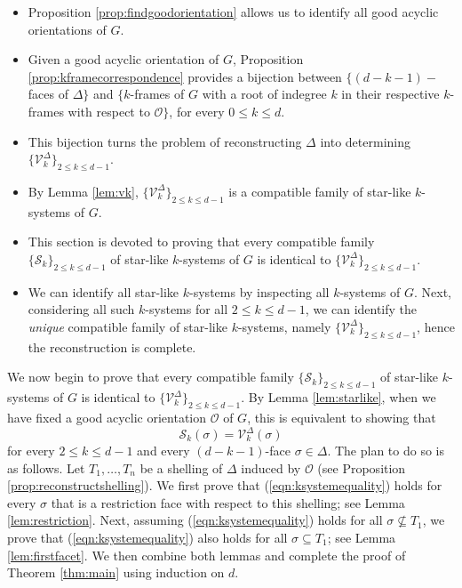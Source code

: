 \documentclass[11pt,twoside]{article}
\theoremstyle{definition}
\newcommand{\cS}{\mathcal{S}}
\newcommand{\cO}{\mathcal{O}}
\newcommand{\cV}{\mathcal{V}}
\begin{document}
\begin{itemize} [label={--}] 

\item Proposition \ref{prop:findgoodorientation} allows us to identify all good acyclic orientations of $G$.

\item Given a good acyclic orientation of $G$, Proposition \ref{prop:kframecorrespondence} provides a bijection between $\{(d-k-1)-$faces of $\Delta\}$ and $\{k$-frames of $G$ with a root of indegree $k$ in their respective $k$-frames with respect to $\cO\}$, for every $0 \le k \le d$. 

\item This bijection turns the problem of reconstructing $\Delta$ into determining $\{\cV^\Delta_k\}_{2 \le k \le d-1}$. 


\item By Lemma \ref{lem:vk},  $\{\cV^\Delta_k\}_{2 \le k \le d-1}$ is a compatible family of star-like $k$-systems of $G$. 

\item This section is devoted to proving that every compatible family $\{\cS_k\}_{2 \le k \le d-1}$ of star-like $k$-systems of $G$ is identical to $\{\cV^\Delta_k\}_{2 \le k \le d-1}$. 

\item We can identify all star-like $k$-systems by inspecting all $k$-systems of $G$. Next, considering all such $k$-systems for all $2 \le k \le d-1$, we can identify the \emph{unique} compatible family of star-like $k$-systems, namely $\{\cV^\Delta_k\}_{2 \le k \le d-1}$, hence the reconstruction is complete.
\end{itemize}

We now begin to prove that every compatible family $\{\cS_k\}_{2 \le k \le d-1}$ of star-like $k$-systems of $G$ is identical to $\{\cV^\Delta_k\}_{2 \le k \le d-1}$. By Lemma \ref{lem:starlike}, when we have fixed a good acyclic orientation $\cO$ of $G$, this is equivalent to showing that 
\begin{equation}\label{eqn:ksystemequality}
    \cS_k(\sigma) = \cV^\Delta_k(\sigma)
\end{equation}
for every $2 \le k \le d-1$ and every $(d-k-1)$-face $\sigma \in \Delta$. The plan to do so is as follows. Let $T_1, \dots, T_n$ be a shelling of $\Delta$ induced by $\cO$ (see Proposition \ref{prop:reconstructshelling}). We first prove that (\ref{eqn:ksystemequality}) holds for every $\sigma$ that is a restriction face with respect to this shelling; see Lemma \ref{lem:restriction}. Next, assuming (\ref{eqn:ksystemequality}) holds for all $\sigma \nsubseteq T_1$, we prove that (\ref{eqn:ksystemequality}) also holds for all $\sigma \subseteq T_1$; see Lemma \ref{lem:firstfacet}. We then combine both lemmas and complete the proof of Theorem \ref{thm:main} using induction on $d$. 
\end{document}
